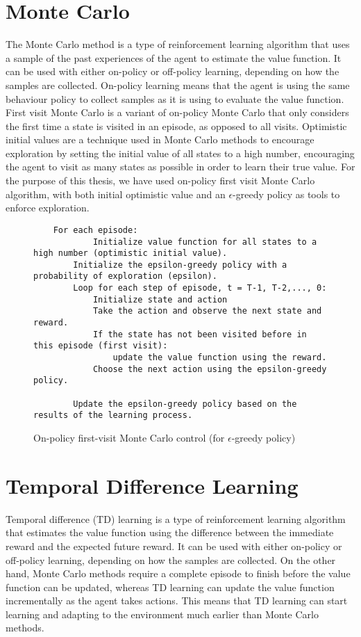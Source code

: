 \section{Monte Carlo}
The Monte Carlo method is a type of reinforcement learning algorithm that uses a sample of the past experiences of the agent to estimate the value function. It can be used with either on-policy or off-policy learning, depending on how the samples are collected. On-policy learning means that the agent is using the same behaviour policy to collect samples as it is using to evaluate the value function. First visit Monte Carlo is a variant of on-policy Monte Carlo that only considers the first time a state is visited in an episode, as opposed to all visits. Optimistic initial values are a technique used in Monte Carlo methods to encourage exploration by setting the initial value of all states to a high number, encouraging the agent to visit as many states as possible in order to learn their true value. For the purpose of this thesis, we have used on-policy first visit Monte Carlo algorithm, with both initial optimistic value and an $\epsilon$-greedy policy as tools to enforce exploration. 


\begin{figure}[h]
    \centering
    \begin{lstlisting}
    For each episode:
    		Initialize value function for all states to a high number (optimistic initial value).
		Initialize the epsilon-greedy policy with a probability of exploration (epsilon).
		Loop for each step of episode, t = T-1, T-2,..., 0:
			Initialize state and action
			Take the action and observe the next state and reward.
			If the state has not been visited before in this episode (first visit):
				update the value function using the reward.
			Choose the next action using the epsilon-greedy policy.
		
		Update the epsilon-greedy policy based on the results of the learning process.
	\end{lstlisting}	
    \caption{On-policy first-visit Monte Carlo control (for $\epsilon$-greedy policy)}
    \label{algo:MC}
\end{figure}

\section{Temporal Difference Learning}
Temporal difference (TD) learning is a type of reinforcement learning algorithm that estimates the value function using the difference between the immediate reward and the expected future reward. It can be used with either on-policy or off-policy learning, depending on how the samples are collected.
On the other hand, Monte Carlo methods require a complete episode to finish before the value function can be updated, whereas TD learning can update the value function incrementally as the agent takes actions. This means that TD learning can start learning and adapting to the environment much earlier than Monte Carlo methods.

